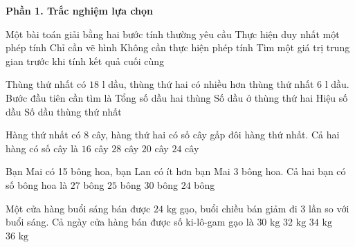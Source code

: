 \textbf{Phần 1. Trắc nghiệm lựa chọn}

\begin{ex} %
Một bài toán giải bằng hai bước tính thường yêu cầu
\choice
{Thực hiện duy nhất một phép tính}
{Chỉ cần vẽ hình}
{Không cần thực hiện phép tính}
{\True Tìm một giá trị trung gian trước khi tính kết quả cuối cùng}
\end{ex}

\begin{ex} %
Thùng thứ nhất có $18\text{ l}$ dầu, thùng thứ hai có nhiều hơn thùng thứ nhất $6\text{ l}$ dầu. Bước đầu tiên cần tìm là
\choice
{Tổng số dầu hai thùng}
{\True Số dầu ở thùng thứ hai}
{Hiệu số dầu}
{Số dầu thùng thứ nhất}
\end{ex}

\begin{ex} %
Hàng thứ nhất có 8 cây, hàng thứ hai có số cây gấp đôi hàng thứ nhất. Cả hai hàng có số cây là
\choice
{$16$ cây}
{$28$ cây}
{$20$ cây}
{\True $24$ cây}
\end{ex}

\begin{ex} %
Bạn Mai có 15 bông hoa, bạn Lan có ít hơn bạn Mai 3 bông hoa. Cả hai bạn có số bông hoa là
\choice
{\True $27$ bông}
{$25$ bông}
{$30$ bông}
{$24$ bông}
\end{ex}

\begin{ex} %
Một cửa hàng buổi sáng bán được $24\text{ kg}$ gạo, buổi chiều bán giảm đi 3 lần so với buổi sáng. Cả ngày cửa hàng bán được số ki-lô-gam gạo là
\choice
{$30\text{ kg}$}
{\True $32\text{ kg}$}
{$34\text{ kg}$}
{$36\text{ kg}$}
\end{ex}

